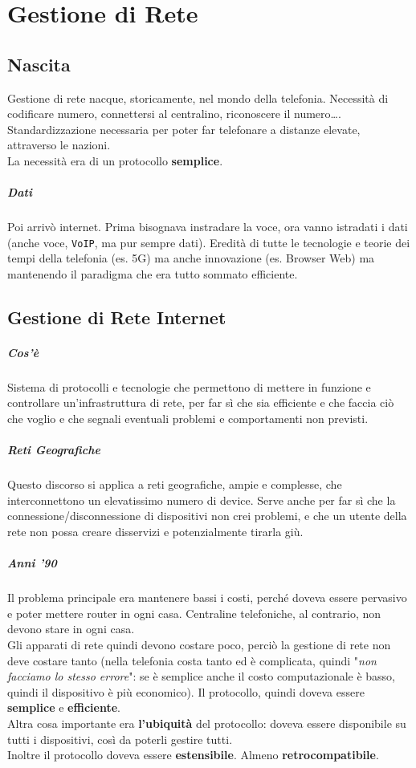 \documentclass[10pt]{book}
\begin{document}
\chapter{Gestione di Rete}
\section{Nascita}
Gestione di rete nacque, storicamente, nel mondo della telefonia. Necessità di codificare numero, connettersi al centralino, riconoscere il numero\ldots. Standardizzazione necessaria per poter far telefonare a distanze elevate, attraverso le nazioni.\\
La necessità era di un protocollo \textbf{semplice}.
\paragraph{Dati} Poi arrivò internet. Prima bisognava instradare la voce, ora vanno istradati i dati (anche voce, \texttt{VoIP}, ma pur sempre dati). Eredità di tutte le tecnologie e teorie dei tempi della telefonia (es. 5G) ma anche innovazione (es. Browser Web) ma mantenendo il paradigma che era tutto sommato efficiente.
\section{Gestione di Rete Internet}
\paragraph{Cos'è} Sistema di protocolli e tecnologie che permettono di mettere in funzione e controllare un'infrastruttura di rete, per far sì che sia efficiente e che faccia ciò che voglio e che segnali eventuali problemi e comportamenti non previsti.
\paragraph{Reti Geografiche} Questo discorso si applica a reti geografiche, ampie e complesse, che interconnettono un elevatissimo numero di device. Serve anche per far sì che la connessione/disconnessione di dispositivi non crei problemi, e che un utente della rete non possa creare disservizi e potenzialmente tirarla giù.
\paragraph{Anni '90} Il problema principale era mantenere bassi i costi, perché doveva essere pervasivo e poter mettere router in ogni casa. Centraline telefoniche, al contrario, non devono stare in ogni casa.\\
Gli apparati di rete quindi devono costare poco, perciò la gestione di rete non deve costare tanto (nella telefonia costa tanto ed è complicata, quindi "\textit{non facciamo lo stesso errore}": se è semplice anche il costo computazionale è basso, quindi il dispositivo è più economico). Il protocollo, quindi doveva essere \textbf{semplice} e \textbf{efficiente}.\\
Altra cosa importante era \textbf{l'ubiquità} del protocollo: doveva essere disponibile su tutti i dispositivi, così da poterli gestire tutti.\\
Inoltre il protocollo doveva essere \textbf{estensibile}. Almeno \textbf{retrocompatibile}.
\end{document}

